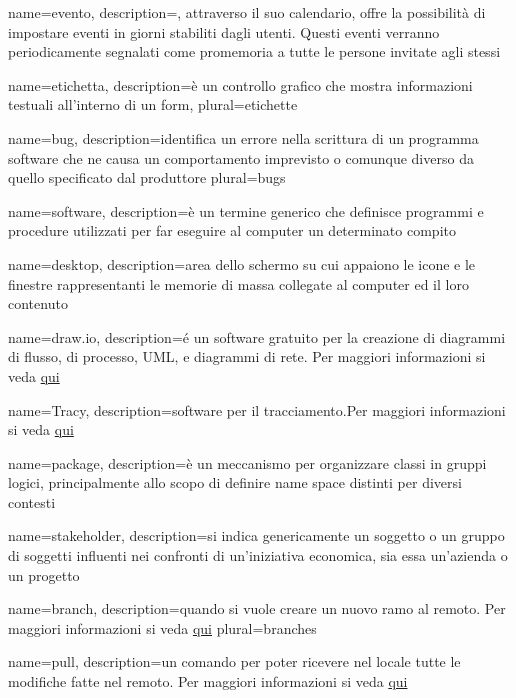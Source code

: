  {
	name=evento,
	description={, attraverso il suo calendario, offre la possibilità di impostare eventi in giorni stabiliti dagli utenti. Questi eventi verranno periodicamente segnalati come promemoria a tutte le persone invitate agli stessi}
}

 {
	name=etichetta,
	description={è un controllo grafico che mostra informazioni testuali all'interno di un form},
	plural=etichette
}

 {
	name=bug,
	description={identifica un errore nella scrittura di un programma software che ne causa un comportamento imprevisto o comunque diverso da quello specificato dal produttore}
	plural=bugs
}

 {
	name=software,
	description={è un termine generico che definisce programmi e procedure utilizzati per far eseguire al computer un determinato compito}
}

 {
	name=desktop,
	description={area dello schermo su cui appaiono le icone e le finestre rappresentanti le memorie di massa collegate al computer ed il loro contenuto}
}

 {
	name=draw.io,
	description={é un software gratuito per la creazione di diagrammi di flusso, di processo, UML, e diagrammi di rete. Per maggiori informazioni si veda \href{https://www.draw.io}{qui}}
}

 {
	name=Tracy,
	description={software  per il tracciamento.Per maggiori informazioni si veda \href{http://tracy-tpiga.rhcloud.com/tracy/}{qui}}
}

 {
	name=package,
	description={è un meccanismo per organizzare classi  in gruppi logici, principalmente allo scopo di definire name space distinti per diversi contesti}
}

 {
	name=stakeholder,
	description={si indica genericamente un soggetto o un gruppo di soggetti influenti nei confronti di un'iniziativa economica, sia essa un'azienda o un progetto}
}

 {
	name=branch,
	description={quando si vuole creare un nuovo ramo al  remoto. Per maggiori informazioni si veda \href{https://git-scm.com/docs/}{qui}}
	plural=branches
}

 {
	name=pull,
	description={un comando  per poter ricevere nel locale tutte le modifiche fatte nel  remoto. Per maggiori informazioni si veda \href{https://git-scm.com/docs/}{qui}}
}


